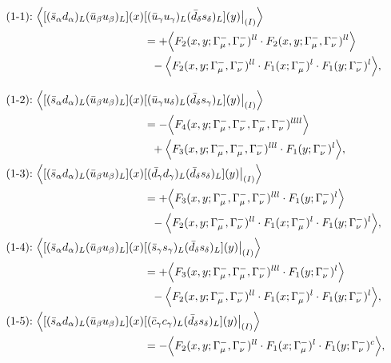 \begin{align}
\mbox{(1-1):}\ 
\Big\langle
[(\bar s_\alpha d_\alpha)_L(\bar u_\beta u_\beta)_L](x)&
[(\bar u_\gamma u_\gamma)_L(\bar d_\delta s_\delta)_L](y)\big|_{(I)}
\Big\rangle
\notag\\*
&=
 + \Big\langle F_2(x,y;\Gamma_\mu^-,\Gamma_\nu^-)^{ll} \cdot F_2(x,y;\Gamma_\mu^-,\Gamma_\nu^-)^{ll}\Big\rangle
\notag\\*&\ \ 
 - \Big\langle F_2(x,y;\Gamma_\mu^-,\Gamma_\nu^-)^{ll} \cdot F_1(x;\Gamma_\mu^-)^l \cdot F_1(y;\Gamma_\nu^-)^l\Big\rangle,
\\[3mm]
\mbox{(1-2):}\ 
\Big\langle
[(\bar s_\alpha d_\alpha)_L(\bar u_\beta u_\beta)_L](x)&
[(\bar u_\gamma u_\delta)_L(\bar d_\delta s_\gamma)_L](y)\big|_{(I)}
\Big\rangle
\notag\\*
&=
 - \Big\langle F_4(x,y;\Gamma_\mu^-,\Gamma_\nu^-,\Gamma_\mu^-,\Gamma_\nu^-)^{llll}\Big\rangle
\notag\\*&\ \ 
 + \Big\langle F_3(x,y;\Gamma_\mu^-,\Gamma_\mu^-,\Gamma_\nu^-)^{lll} \cdot F_1(y;\Gamma_\nu^-)^l\Big\rangle,
\\
\mbox{(1-3):}\ 
\Big\langle
[(\bar s_\alpha d_\alpha)_L(\bar u_\beta u_\beta)_L](x)&
[(\bar d_\gamma d_\gamma)_L(\bar d_\delta s_\delta)_L](y)\big|_{(I)}
\Big\rangle
\notag\\*
&=
 + \Big\langle F_3(x,y;\Gamma_\mu^-,\Gamma_\mu^-,\Gamma_\nu^-)^{lll} \cdot F_1(y;\Gamma_\nu^-)^l\Big\rangle
\notag\\*&\ \ 
 - \Big\langle F_2(x,y;\Gamma_\mu^-,\Gamma_\nu^-)^{ll} \cdot F_1(x;\Gamma_\mu^-)^l \cdot F_1(y;\Gamma_\nu^-)^l\Big\rangle,
\\
\mbox{(1-4):}\ 
\Big\langle
[(\bar s_\alpha d_\alpha)_L(\bar u_\beta u_\beta)_L](x)&
[(\bar s_\gamma s_\gamma)_L(\bar d_\delta s_\delta)_L](y)\big|_{(I)}
\Big\rangle
\notag\\*
&=
 + \Big\langle F_3(x,y;\Gamma_\mu^-,\Gamma_\mu^-,\Gamma_\nu^-)^{lll} \cdot F_1(y;\Gamma_\nu^-)^l\Big\rangle
\notag\\*&\ \ 
 - \Big\langle F_2(x,y;\Gamma_\mu^-,\Gamma_\nu^-)^{ll} \cdot F_1(x;\Gamma_\mu^-)^l \cdot F_1(y;\Gamma_\nu^-)^l\Big\rangle,
\\
\mbox{(1-5):}\ 
\Big\langle
[(\bar s_\alpha d_\alpha)_L(\bar u_\beta u_\beta)_L](x)&
[(\bar c_\gamma c_\gamma)_L(\bar d_\delta s_\delta)_L](y)\big|_{(I)}
\Big\rangle
\notag\\*
&=
 - \Big\langle F_2(x,y;\Gamma_\mu^-,\Gamma_\nu^-)^{ll} \cdot F_1(x;\Gamma_\mu^-)^l \cdot F_1(y;\Gamma_\nu^-)^c\Big\rangle,
\\

\end{align}
